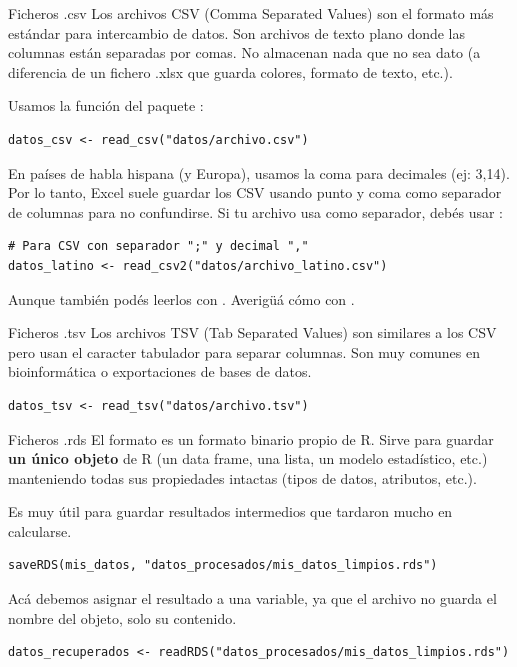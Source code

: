 \documentclass[8pt]{beamer}
\begin{document}
\begin{frame}[fragile]{Ficheros .csv}
Los archivos CSV (Comma Separated Values) son el formato más estándar para intercambio de datos. Son archivos de texto plano donde las columnas están separadas por comas. No almacenan nada que no sea dato (a diferencia de un fichero .xlsx que guarda colores, formato de texto, etc.).

Usamos la función  del paquete :
\begin{lstlisting}[style=RScript]
datos_csv <- read_csv("datos/archivo.csv")	
\end{lstlisting}

En países de habla hispana (y Europa), usamos la coma \rscript{,} para decimales (ej: 3,14). Por lo tanto, Excel suele guardar los CSV usando punto y coma \rscript{;} como separador de columnas para no confundirse. Si tu archivo usa \rscript{;} como separador, deb\'es usar :
\begin{lstlisting}[style=RScript]
# Para CSV con separador ";" y decimal ","
datos_latino <- read_csv2("datos/archivo_latino.csv")	
\end{lstlisting}

Aunque tambi\'en pod\'es leerlos con . Averig\"u\'a c\'omo con .
\end{frame}




\begin{frame}[fragile]{Ficheros .tsv}
Los archivos TSV (Tab Separated Values) son similares a los CSV pero usan el caracter tabulador para separar columnas. Son muy comunes en bioinformática o exportaciones de bases de datos.
\begin{lstlisting}[style=RScript]
datos_tsv <- read_tsv("datos/archivo.tsv")	
\end{lstlisting}
\end{frame}



\begin{frame}[fragile]{Ficheros .rds}
El formato  es un formato binario propio de R. Sirve para guardar \textbf{un único objeto} de R (un data frame, una lista, un modelo estadístico, etc.) manteniendo todas sus propiedades intactas (tipos de datos, atributos, etc.).

Es muy útil para guardar resultados intermedios que tardaron mucho en calcularse.

\begin{lstlisting}[style=RScript]
saveRDS(mis_datos, "datos_procesados/mis_datos_limpios.rds")
\end{lstlisting}


Ac\'a debemos asignar el resultado a una variable, ya que el archivo no guarda el nombre del objeto, solo su contenido.
\begin{lstlisting}[style=RScript]
datos_recuperados <- readRDS("datos_procesados/mis_datos_limpios.rds")
\end{lstlisting}
\end{frame}
\end{document}
